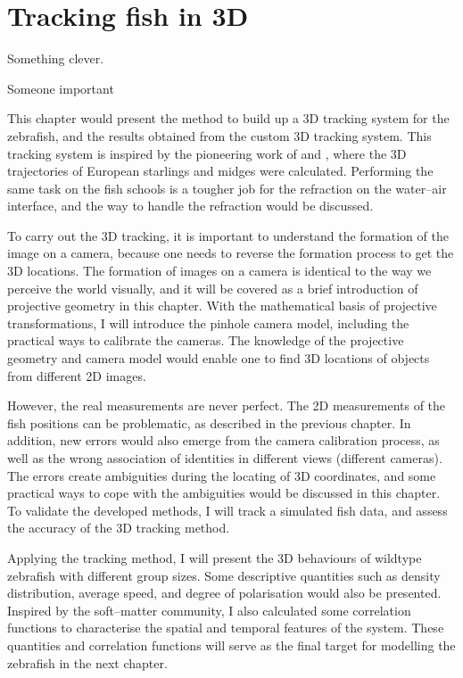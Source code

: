 \documentclass[11pt,twoside]{report}
\begin{document}
\chapter{Tracking fish in 3D}

\epigraph{Something clever.}{Someone important}

This chapter would present the method to build up a 3D tracking system for the zebrafish, and the results obtained from the custom 3D tracking system. This tracking system is inspired by the pioneering work of \citeauthor{cavagna2008} \cite{cavagna2008} and \citeauthor{kelley2013} \cite{kelley2013}, where the 3D trajectories of European starlings and midges were calculated. Performing the same task on the fish schools is a tougher job for the refraction on the water--air interface, and the way to handle the refraction would be discussed.

To carry out the 3D tracking, it is important to understand the formation of the image on a camera, because one needs to reverse the formation process to get the 3D locations. The formation of images on a camera is identical to the way we perceive the world visually, and it will be covered as a brief introduction of projective geometry in this chapter. With the mathematical basis of projective transformations, I will introduce the pinhole camera model, including the practical ways to calibrate the cameras. The knowledge of the projective geometry and camera model would enable one to find 3D locations of objects from different 2D images.

However, the real measurements are never perfect. The 2D measurements of the fish positions can be problematic, as described in the previous chapter. In addition, new errors would also emerge from the camera calibration process, as well as the wrong association of identities in different views (different cameras). The errors create ambiguities during the locating of 3D coordinates, and some practical ways to cope with the ambiguities would be discussed in this chapter. To validate the developed methods, I will track a simulated fish data, and assess the accuracy of the 3D tracking method.

Applying the tracking method, I will present the 3D behaviours of wildtype zebrafish with different group sizes. Some descriptive quantities such as density distribution, average speed, and degree of polarisation would also be presented. Inspired by the soft--matter community, I also calculated some correlation functions to characterise the spatial and temporal features of the system. These quantities and correlation functions will serve as the final target for modelling the zebrafish in the next chapter.
\end{document}
